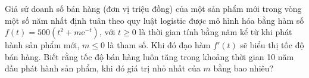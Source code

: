 \begin{bt}%
	Giả sử doanh số bán hàng (đơn vị triệu đồng) của một sản phẩm mới trong vòng một số năm nhất định tuân theo quy luật logistic được mô hình hóa bằng hàm số $f\left(t \right)=500\left(t^2+m\mathrm{e}^{-t} \right)$, với $t\ge 0$ là thời gian tính bằng năm kể từ khi phát hành sản phẩm mới, $m\le 0$ là tham số. Khi đó đạo hàm $f'\left(t \right)$ sẽ biểu thị tốc độ bán hàng. Biết rằng tốc độ bán hàng luôn tăng trong khoảng thời gian 10 năm đầu phát hành sản phẩm, khi đó giá trị nhỏ nhất của $m$ bằng bao nhiêu?
\end{bt}

